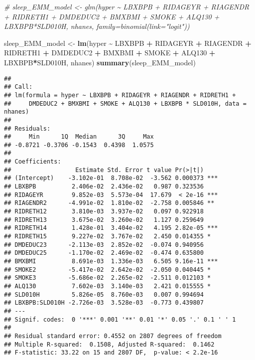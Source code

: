 \documentclass[
]{article}
\newenvironment{Shaded}{\begin{snugshade}}{\end{snugshade}}
\newcommand{\CommentTok}[1]{\textcolor[rgb]{0.56,0.35,0.01}{\textit{#1}}}
\newcommand{\FunctionTok}[1]{\textcolor[rgb]{0.13,0.29,0.53}{\textbf{#1}}}
\newcommand{\NormalTok}[1]{#1}
\newcommand{\OtherTok}[1]{\textcolor[rgb]{0.56,0.35,0.01}{#1}}
\newcommand{\SpecialCharTok}[1]{\textcolor[rgb]{0.81,0.36,0.00}{\textbf{#1}}}
\begin{document}
\begin{Shaded}
\begin{Highlighting}[]
\CommentTok{\# sleep\_EMM\_model \textless{}{-} glm(hyper \textasciitilde{} LBXBPB + RIDAGEYR + RIAGENDR + RIDRETH1 + DMDEDUC2 + BMXBMI + SMOKE + ALQ130 + LBXBPB*SLD010H, nhanes, family=binomial(link="logit"))}

\NormalTok{sleep\_EMM\_model }\OtherTok{\textless{}{-}} \FunctionTok{lm}\NormalTok{(hyper }\SpecialCharTok{\textasciitilde{}}\NormalTok{ LBXBPB }\SpecialCharTok{+}\NormalTok{ RIDAGEYR }\SpecialCharTok{+}\NormalTok{ RIAGENDR }\SpecialCharTok{+}\NormalTok{ RIDRETH1 }\SpecialCharTok{+}\NormalTok{ DMDEDUC2 }\SpecialCharTok{+}\NormalTok{ BMXBMI }\SpecialCharTok{+}\NormalTok{ SMOKE }\SpecialCharTok{+}\NormalTok{ ALQ130 }\SpecialCharTok{+}\NormalTok{ LBXBPB}\SpecialCharTok{*}\NormalTok{SLD010H, nhanes)}
\FunctionTok{summary}\NormalTok{(sleep\_EMM\_model)}
\end{Highlighting}
\end{Shaded}

\begin{verbatim}
## 
## Call:
## lm(formula = hyper ~ LBXBPB + RIDAGEYR + RIAGENDR + RIDRETH1 + 
##     DMDEDUC2 + BMXBMI + SMOKE + ALQ130 + LBXBPB * SLD010H, data = nhanes)
## 
## Residuals:
##     Min      1Q  Median      3Q     Max 
## -0.8721 -0.3706 -0.1543  0.4398  1.0575 
## 
## Coefficients:
##                  Estimate Std. Error t value Pr(>|t|)    
## (Intercept)    -3.102e-01  8.708e-02  -3.562 0.000373 ***
## LBXBPB          2.406e-02  2.436e-02   0.987 0.323536    
## RIDAGEYR        9.852e-03  5.573e-04  17.679  < 2e-16 ***
## RIAGENDR2      -4.991e-02  1.810e-02  -2.758 0.005846 ** 
## RIDRETH12       3.810e-03  3.937e-02   0.097 0.922918    
## RIDRETH13       3.675e-02  3.260e-02   1.127 0.259649    
## RIDRETH14       1.428e-01  3.404e-02   4.195 2.82e-05 ***
## RIDRETH15       9.227e-02  3.767e-02   2.450 0.014355 *  
## DMDEDUC23      -2.113e-03  2.852e-02  -0.074 0.940956    
## DMDEDUC25      -1.170e-02  2.469e-02  -0.474 0.635800    
## BMXBMI          8.691e-03  1.336e-03   6.505 9.16e-11 ***
## SMOKE2         -5.417e-02  2.642e-02  -2.050 0.040445 *  
## SMOKE3         -5.686e-02  2.265e-02  -2.511 0.012103 *  
## ALQ130          7.602e-03  3.140e-03   2.421 0.015555 *  
## SLD010H         5.826e-05  8.760e-03   0.007 0.994694    
## LBXBPB:SLD010H -2.726e-03  3.528e-03  -0.773 0.439807    
## ---
## Signif. codes:  0 '***' 0.001 '**' 0.01 '*' 0.05 '.' 0.1 ' ' 1
## 
## Residual standard error: 0.4552 on 2807 degrees of freedom
## Multiple R-squared:  0.1508, Adjusted R-squared:  0.1462 
## F-statistic: 33.22 on 15 and 2807 DF,  p-value: < 2.2e-16
\end{verbatim}
\end{document}
